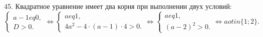 45. Квадратное уравнение имеет два корня при выполнении двух условий:\\ $\begin{cases}a-1
eq0,\\ D>0.\end{cases}\Leftrightarrow
\begin{cases}a
eq1,\\ 4a^2-4\cdot(a-1)\cdot4>0.\end{cases}\Leftrightarrow
\begin{cases}a
eq1,\\ (a-2)^2>0.\end{cases}\Leftrightarrow a
otin\{1;2\}.$\\
